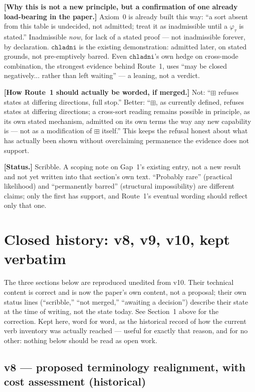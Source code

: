 \documentclass[11pt]{article}
\begin{document}
\textbf{[Why this is not a new principle, but a confirmation of one
already load-bearing in the paper.]} Axiom~0 is already built this
way: ``a sort absent from this table is undecided, not admitted;
treat it as inadmissible until a $\varphi_\tau$ is stated.''
Inadmissible \emph{now}, for lack of a stated proof --- not
inadmissible forever, by declaration. $\mathtt{chladni}$ is the
existing demonstration: admitted later, on stated grounds, not
pre-emptively barred. Even $\mathtt{chladni}$'s own hedge on
cross-mode combination, the strongest evidence behind Route~1, uses
``may be closed negatively... rather than left waiting'' --- a
leaning, not a verdict.

\textbf{[How Route~1 should actually be worded, if merged.]} Not:
``$\boxplus$ refuses states at differing directions, full stop.''
Better: ``$\boxplus$, as currently defined, refuses states at
differing directions; a cross-sort reading remains possible in
principle, as its own stated mechanism, admitted on its own terms the
way any new capability is --- not as a modification of $\boxplus$
itself.'' This keeps the refusal honest about what has actually been
shown without overclaiming permanence the evidence does not support.

\textbf{[Status.]} Scribble. A scoping note on Gap~1's existing entry,
not a new result and not yet written into that section's own text.
``Probably rare'' (practical likelihood) and ``permanently barred''
(structural impossibility) are different claims; only the first has
support, and Route~1's eventual wording should reflect only that one.

\section{Closed history: v8, v9, v10, kept verbatim}
\label{sec:closed_history}

The three sections below are reproduced unedited from v10. Their
technical content is correct and is now the paper's own content, not
a proposal; their own status lines (``scribble,'' ``not merged,''
``awaiting a decision'') describe their state at the time of writing,
not the state today. See Section~1 above for the correction. Kept
here, word for word, as the historical record of how the current
verb inventory was actually reached --- useful for exactly that
reason, and for no other: nothing below should be read as open work.

\subsection*{v8 --- proposed terminology realignment, with cost
assessment (historical)}
\end{document}
